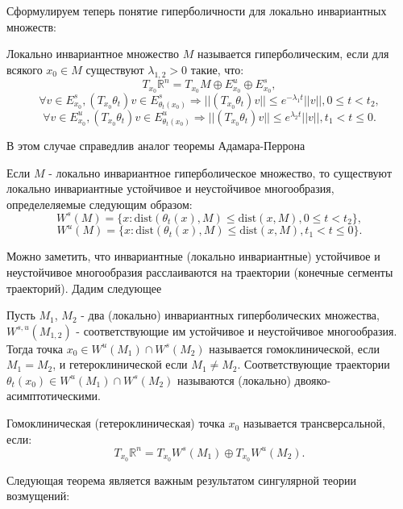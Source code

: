 Сформулируем теперь понятие гиперболичности для локально инвариантных множеств:

\begin{dfn}
Локально инвариантное множество $M$ называется гиперболическим, если для всякого $x_0 \in M$ существуют $\lambda_{1,2} > 0$ такие, что:
$$T_{x_0}\mathbb{R}^{n} = T_{x_0} M \oplus E_{x_0}^u \oplus E_{x_0}^s ,$$
$$\forall v \in E_{x_0}^s, (T_{x_0} \theta_t)v \in E_{\theta_t(x_0)}^s \Rightarrow ||(T_{x_0} \theta_t)v|| \leq e^{-\lambda_1 t} ||v||, 0\le t < t_{2} ,$$
$$\forall v \in E_{x_0}^u, (T_{x_0} \theta_t)v \in E_{\theta_t(x_0)}^u \Rightarrow ||(T_{x_0} \theta_t)v|| \leq e^{\lambda_2 t} ||v||, t_{1} < t \le 0 .$$
\end{dfn}

В этом случае справедлив аналог теоремы Адамара-Перрона \cite{berger}

\begin{thm}

Если $M$ - локально инвариантное гиперболическое множество, то существуют локально инвариантные устойчивое и неустойчивое многообразия, определеляемые следующим образом:
$$W^s(M) = \{ x: \text{dist}(\theta_t(x), M) \le \text{dist}(x, M), 0\le t < t_{2} \},$$
$$W^u(M) = \{ x: \text{dist}(\theta_t(x), M) \le \text{dist}(x, M), t_{1} <  t \le 0 \}.$$
\end{thm}

Можно заметить, что инвариантные (локально инвариантные) устойчивое и неустойчивое многообразия расслаиваются на траектории (конечные сегменты траекторий). Дадим следующее

\begin{dfn}
Пусть $M_1$, $M_2$ - два (локально) инвариантных гиперболических множества, $W^{s,u}(M_{1,2})$ - соответствующие им устойчивое и неустойчивое многообразия. Тогда точка $x_0 \in W^u(M_1) \cap W^s(M_2)$ называется гомоклинической, если $M_1 = M_2$, и гетероклинической если $M_1 \neq M_2$. Соответствующие траектории $\theta_t(x_0) \in W^u(M_1) \cap W^s(M_2)$ называются (локально) двояко-асимптотическими.
\end{dfn}

\begin{dfn}
Гомоклиническая (гетероклиническая) точка $x_0$ называется трансверсальной, если:
$$T_{x_0}\mathbb{R}^{n} = T_{x_0}W^s(M_1) \oplus T_{x_0}W^u(M_2).$$
\end{dfn}

Следующая теорема является важным результатом сингулярной теории возмущений:

